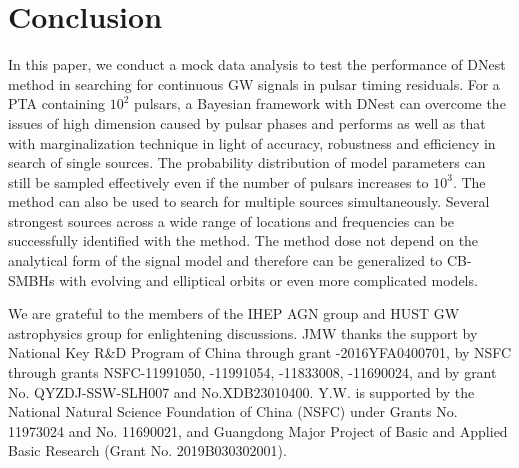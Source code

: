 \documentclass[times,tight]{aastex631}
\begin{document}
\section{Conclusion}
In this paper, we conduct a mock data analysis to test the performance of DNest method in searching for continuous GW signals in pulsar timing residuals.
For a PTA containing $10^2$ pulsars, a Bayesian framework with DNest can overcome the issues of high dimension caused by pulsar phases and performs as well as that with marginalization technique in light of accuracy, robustness and efficiency in search of single sources.
The probability distribution of model parameters can still be sampled effectively even if the number of pulsars increases to $10^3$.
The method can also be used to search for multiple sources simultaneously.
Several strongest sources across a wide range of locations and frequencies can be successfully identified with the method.
The method dose not depend on the analytical form of the signal model and therefore can be generalized to CB-SMBHs with evolving and elliptical orbits or even more complicated models.

\begin{acknowledgments}
We are grateful to the members of the IHEP AGN group and HUST GW astrophysics group for enlightening discussions.
JMW thanks the support by National Key R\&D Program of China through grant -2016YFA0400701, by NSFC through grants NSFC-11991050, -11991054, -11833008, -11690024, and by grant No. QYZDJ-SSW-SLH007 and No.XDB23010400. 
Y.W. is supported by the National Natural Science Foundation of China (NSFC) under Grants No. 11973024 and No. 11690021, and Guangdong Major Project of Basic and Applied Basic Research (Grant No. 2019B030302001). 
\end{acknowledgments}

\appendix
\end{document}
